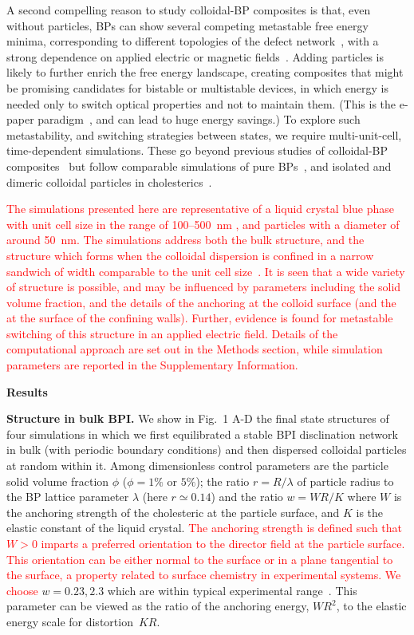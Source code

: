 \documentclass[12pt]{article}
\begin{document}
A second compelling reason to study colloidal-BP composites is that, even without particles, BPs can show several competing metastable free energy minima,
corresponding to different topologies of the defect network~\cite{adriano,fukuda}, with a strong dependence on applied electric or magnetic fields~\cite{henrichfield}.
% 
Adding particles is likely to further enrich the free energy landscape, creating composites that might be promising candidates for bistable or multistable devices, in which energy is needed only to switch optical properties and not to maintain them. (This is the e-paper paradigm~\cite{epaper}, and can lead to huge energy savings.)
To explore such metastability, and switching strategies between states, we require multi-unit-cell, time-dependent simulations. These go beyond previous studies of colloidal-BP composites~\cite{miha} but follow comparable simulations of pure BPs~\cite{bp3,henrichfield,domaingrowth}, and isolated and dimeric colloidal particles in cholesterics~\cite{juho1,juho2}.

\textcolor{red}{
The simulations presented here are representative of a liquid crystal
blue phase with unit cell size in the range of 100--500~nm \cite{mermin},
and particles with a diameter of around 50~nm. The simulations
address both the bulk structure, and the structure which forms when
the colloidal dispersion is confined in a narrow sandwich of width
comparable to the unit cell size~\cite{extrareference2}. It is seen
that a wide variety of structure is possible, and may be influenced
by parameters including the solid volume fraction, and the details
of the anchoring at the colloid surface (and the at the surface of the
confining walls). Further, evidence is found for metastable switching of
this structure in an applied electric field. Details of the
computational approach are set out in the Methods section, while
simulation parameters are reported in the Supplementary Information.
}

\bigskip
\noindent
\textbf{\large Results}

\noindent
\textbf{Structure in bulk BPI.}
We show in Fig.~1 A-D the final state structures of four simulations in which we first equilibrated a stable BPI disclination network in bulk (with periodic boundary conditions) and then dispersed colloidal particles at random within it. Among dimensionless control parameters are the particle solid volume fraction $\phi$  ($\phi = 1\%$ or $5\%$); the ratio $r = R/\lambda$ of particle radius to the BP lattice parameter $\lambda$ (here $r\simeq 0.14$) and the ratio $w = WR/K$ where $W$ is the anchoring strength of the cholesteric at the particle surface, and $K$ is the elastic constant of the liquid crystal.
\textcolor{red}{
The anchoring strength is defined such that $W > 0$ imparts a preferred
orientation to the director field at the particle surface. This orientation
can be either normal to the surface or in a plane tangential to the surface,
a property related to surface chemistry in experimental systems.%
We choose} $w = 0.23, 2.3$ which are within typical experimental range~\cite{tiffany}. This parameter can be viewed as the ratio of the anchoring energy, $WR^2$, to the elastic energy scale for distortion~$KR$. 
\end{document}
